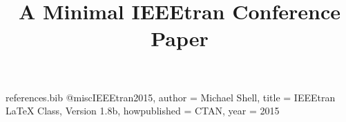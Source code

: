 \begin{filecontents*}{references.bib}
@misc{IEEEtran2015,
  author       = {Michael Shell},
  title        = {{IEEEtran} LaTeX Class, Version 1.8b},
  howpublished = {CTAN},
  year         = {2015}
}
\end{filecontents*}

\documentclass[conference]{IEEEtran}

\usepackage{cite}
\usepackage{graphicx}



\title{A Minimal IEEEtran Conference Paper}

\author{
\and
{}
}

\maketitle

\begin{abstract}
This minimal example demonstrates the structure of an IEEEtran conference paper using BibTeX and the IEEEtran bibliography style.
\end{abstract}

\begin{IEEEkeywords}
IEEEtran, conference, LaTeX.
\end{IEEEkeywords}

\section{Introduction}

This source uses the IEEEtran class and cites the IEEEtran package record \cite{IEEEtran2015}.

\section{Approach}

Conference manuscript content should be converted without changing author meaning.

\section{Conclusion}

The compiled PDF should be checked locally before PDF eXpress upload.





